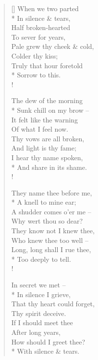 \documentclass[MAIN]{subfiles}
\begin{document}
\settowidth{\versewidth}{When we two parted}
\begin{verse}[\versewidth]
When we two parted\\*
\vin In silence \& tears,\\
Half broken-hearted\\
\vin To sever for years,\\
Pale grew thy cheek \& cold,\\
\vin Colder thy kiss;\\
Truly that hour foretold\\*
\vin Sorrow to this.\\!

The dew of the morning\\*
\vin Sunk chill on my brow --\\
It felt like the warning\\
\vin Of what I feel now.\\
Thy vows are all broken,\\
\vin And light is thy fame;\\
I hear thy name spoken,\\*
\vin And share in its shame.\\!

They name thee before me,\\*
\vin A knell to mine ear;\\
A shudder comes o'er me --\\
\vin Why wert thou so dear?\\
They know not I knew thee,\\
\vin Who knew thee too well --\\
Long, long shall I rue thee,\\*
\vin Too deeply to tell.\\!

In secret we met --\\*
\vin In silence I grieve,\\
That thy heart could forget,\\
\vin Thy spirit deceive.\\
If I should meet thee\\
\vin After long years,\\
How should I greet thee?\\*
\vin With silence \& tears.
\end{verse}
\end{document}

